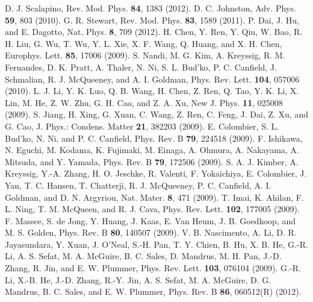 \documentclass[twocolumn,aps,showpacs,prb]{revtex4-1}
\begin{document}
\begin{thebibliography}{}
D. J. Scalapino, Rev. Mod. Phys. {\bf 84}, 1383 (2012).
D. C. Johnston, Adv. Phys. {\bf 59}, 803 (2010).
G. R. Stewart, Rev. Mod. Phys. {\bf 83}, 1589 (2011).
 P. Dai, J. Hu, and E. Dagotto, Nat. Phys. {\bf 8}, 709 (2012).
H. Chen, Y. Ren, Y. Qiu, W. Bao, R. H. Liu, G. Wu, T. Wu, Y. L. Xie, X. F. Wang, Q. Huang, and X. H. Chen, Europhys. Lett. {\bf 85}, 17006 (2009).
S. Nandi, M. G. Kim, A. Kreyssig, R. M. Fernandes, D. K. Pratt, A. Thaler, N. Ni, S. L. Bud'ko, P. C. Canfield, J. Schmalian, R. J. McQueeney, and A. I. Goldman, Phys. Rev. Lett. {\bf 104}, 057006 (2010).
L. J. Li, Y. K. Luo, Q. B. Wang, H. Chen, Z. Ren, Q. Tao, Y. K. Li, X. Lin, M. He, Z. W. Zhu, G. H. Cao, and Z. A. Xu, New J. Phys. {\bf 11}, 025008 (2009).
 S. Jiang, H. Xing, G. Xuan, C. Wang, Z. Ren, C. Feng, J. Dai, Z. Xu, and G. Cao, J. Phys.: Condens. Matter {\bf 21}, 382203 (2009).
 E. Colombier, S. L. Bud'ko, N. Ni, and P. C. Canfield, Phys. Rev. B {\bf 79}, 224518 (2009).
F. Ishikawa, N. Eguchi, M. Kodama, K. Fujimaki, M. Einaga, A. Ohmura, A. Nakayama, A. Mitsuda, and Y. Yamada, Phys. Rev. B {\bf 79}, 172506 (2009).
S. A. J. Kimber, A. Kreyssig, Y.-A. Zhang, H. O. Jeschke, R. Valenti, F. Yokaichiya, E. Colombier, J. Yan, T. C. Hansen, T. Chatterji, R. J. McQueeney, P. C. Canfield, A. I. Goldman, and D. N. Argyriou, Nat. Mater. {\bf 8}, 471 (2009).
T. Imai, K. Ahilan, F. L. Ning, T. M. McQueen, and R. J. Cava, Phys. Rev. Lett. {\bf 102}, 177005 (2009).
F. Massee, S. de Jong, Y. Huang, J. Kaas, E. Van Heum, J. B. Goedkoop, and M. S. Golden, Phys. Rev. B {\bf 80}, 140507 (2009).
V. B. Nascimento, A. Li, D. R. Jayasundara, Y. Xuan, J. O'Neal, S.-H. Pan, T. Y. Chien, B. Hu, X. B. He, G.-R. Li, A. S. Sefat, M. A. McGuire, B. C. Sales, D. Mandrus, M. H. Pan, J.-D. Zhang, R. Jin, and E. W. Plummer, Phys. Rev. Lett. {\bf 103}, 076104 (2009).
G.-R. Li, X.-B. He, J.-D. Zhang, R.-Y. Jin, A. S. Sefat, M. A. McGuire, D. G. Mandrus, B. C. Sales, and E. W. Plummer, Phys. Rev. B {\bf 86}, 060512(R) (2012).

\end{thebibliography}
\end{document}
